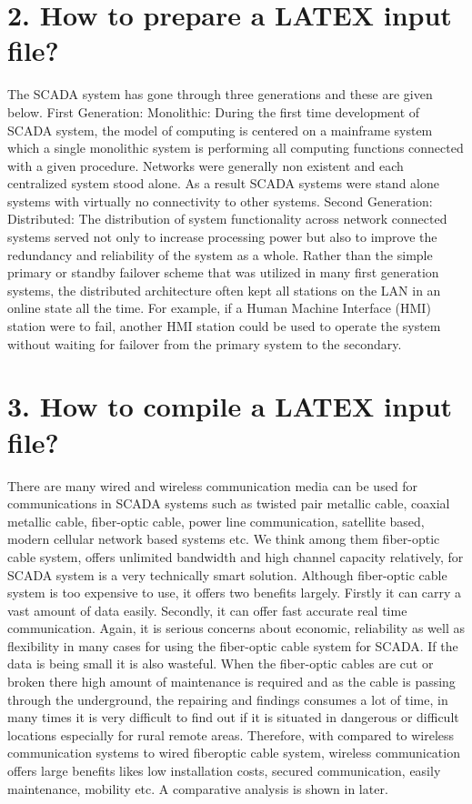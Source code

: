 \documentclass[conference]{IEEEtran}
\begin{document}
\begin{Summary - }
\section{2. How to prepare a LATEX input file?}
\label{sec:op}

The SCADA system has gone through three generations
and these are given below. First Generation: Monolithic:
During the first time development of SCADA system, the
model of computing is centered on a mainframe system which
a single monolithic system is performing all computing
functions connected with a given procedure. Networks were
generally non existent and each centralized system stood alone.
As a result SCADA systems were stand alone systems with
virtually no connectivity to other systems. Second Generation:
Distributed: The distribution of system functionality across
network connected systems served not only to increase
processing power but also to improve the redundancy and
reliability of the system as a whole. Rather than the simple
primary or standby failover scheme that was utilized in many
first generation systems, the distributed architecture often kept
all stations on the LAN in an online state all the time. For
example, if a Human Machine Interface (HMI) station were to
fail, another HMI station could be used to operate the system
without waiting for failover from the primary system to the
secondary. 

\vspace{1cm}

\section{3. How to compile a LATEX input file?}
There are many wired and wireless communication media
can be used for communications in SCADA systems such as
twisted pair metallic cable, coaxial metallic cable, fiber-optic
cable, power line communication, satellite based, modern
cellular network based systems etc. We think among them
fiber-optic cable system, offers unlimited bandwidth and high
channel capacity relatively, for SCADA system is a very
technically smart solution. Although fiber-optic cable system is
too expensive to use, it offers two benefits largely. Firstly it can
carry a vast amount of data easily. Secondly, it can offer fast
accurate real time communication. Again, it is serious concerns
about economic, reliability as well as flexibility in many cases
for using the fiber-optic cable system for SCADA. If the data is
being small it is also wasteful. When the fiber-optic cables are
cut or broken there high amount of maintenance is required and
as the cable is passing through the underground, the repairing
and findings consumes a lot of time, in many times it is very
difficult to find out if it is situated in dangerous or difficult
locations especially for rural remote areas. Therefore, with
compared to wireless communication systems to wired fiberoptic cable system, wireless communication offers large
benefits likes low installation costs, secured communication,
easily maintenance, mobility etc. A comparative analysis is
shown in later.


\end{Summary - }
\end{document}
